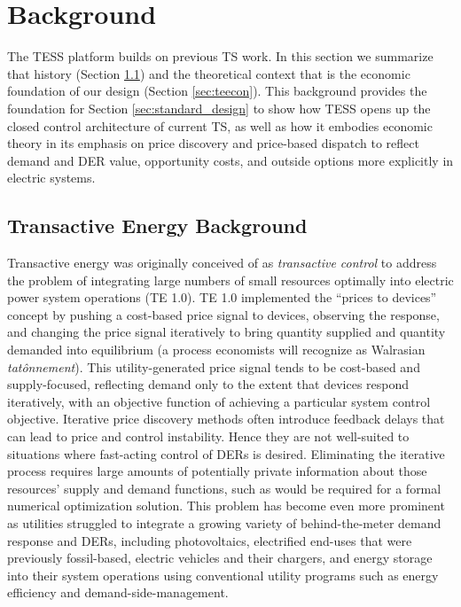 \section{Background}\label{sec:background}

The TESS platform builds on previous TS work. In this section we summarize that history (Section \ref{sec:tehistory}) and the theoretical context that is the economic foundation of our design (Section \ref{sec:teecon}).
This background provides the foundation for Section \ref{sec:standard_design} to show how TESS opens up the closed control architecture of current TS, as well as how it embodies economic theory in its emphasis on price discovery and price-based dispatch to reflect demand and DER value, opportunity costs, and outside options more explicitly in electric systems.

\subsection{Transactive Energy Background}\label{sec:tehistory} 

Transactive energy was originally conceived of as \emph{transactive control} to address the problem of integrating large numbers of small resources optimally into electric power system operations (TE 1.0).
TE 1.0 implemented the ``prices to devices'' concept by pushing a cost-based price signal to devices, observing the response, and changing the price signal iteratively to bring quantity supplied and quantity demanded into equilibrium (a process economists will recognize as Walrasian \emph{tat\^{o}nnement}). This utility-generated price signal tends to be cost-based and supply-focused, reflecting demand only to the extent that devices respond iteratively, with an objective function of achieving a particular system control objective.
Iterative price discovery methods often introduce feedback delays that can lead to price and control instability. Hence they are not well-suited to situations where fast-acting control of DERs is desired.
Eliminating the iterative process requires large amounts of potentially private information about those resources' supply and demand functions, such as would be required for a formal numerical optimization solution.  This problem has become even more prominent as utilities struggled to integrate a growing variety of behind-the-meter demand response and DERs, including photovoltaics, electrified end-uses that were previously fossil-based, electric vehicles and their chargers, and energy storage into their system operations using conventional utility programs such as energy efficiency and demand-side-management. 


